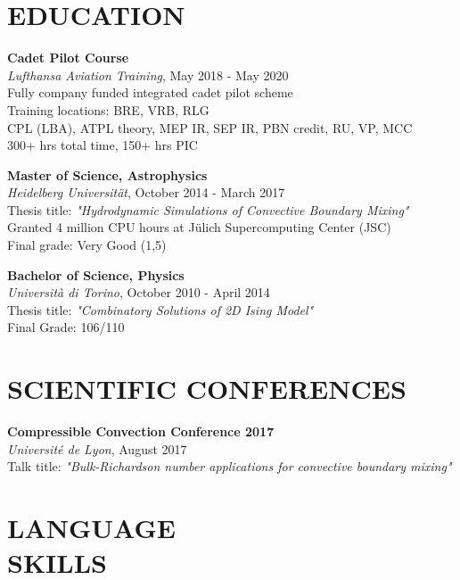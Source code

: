 \documentclass[margin]{res}
\begin{document}
\begin{resume}
\section{EDUCATION}

\textbf{Cadet Pilot Course}\\
{\sl Lufthansa Aviation Training}, May 2018 - May 2020\\
Fully company funded integrated cadet pilot scheme\\
Training locations: BRE, VRB, RLG\\
CPL (LBA), ATPL theory, MEP IR, SEP IR, PBN credit, RU, VP, MCC\\
300+ hrs total time, 150+ hrs PIC

\textbf{Master of Science, Astrophysics}\\
{\sl Heidelberg Universität}, October 2014 - March 2017\\
Thesis title: \textit{"Hydrodynamic Simulations of Convective Boundary Mixing"}\\
Granted 4 million CPU hours at Jülich Supercomputing Center (JSC)\\
\hfill Final grade: Very Good (1,5)

\textbf{Bachelor of Science, Physics} \\
{\sl Università di Torino}, October 2010 - April 2014\\
Thesis title: \textit{"Combinatory Solutions of 2D Ising Model"}\\
\hfill Final Grade: 106/110
\section{SCIENTIFIC CONFERENCES}

\textbf{Compressible Convection Conference 2017}\\
{\sl Université de Lyon}, August 2017\\
Talk title: \textit{"Bulk-Richardson number applications for convective boundary mixing"}  

\bigskip

\pagebreak

\section{LANGUAGE\\SKILLS}


\end{resume}
\end{document}

